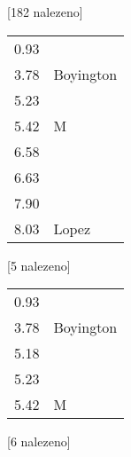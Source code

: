 \begin{table}[H]
\begin{tt}

\horizlina

\noindent
\begin{minipage}[t]{.5\textwidth}\vspace{0pt}
 [182 nalezeno]\vspace{5pt}

\begin{tabulary}{1.1\textwidth}{LL}
0.93 &   \\
3.78 &  Boyington \\
5.23 &   \\
5.42 &  M  \\
6.58 &   \\
6.63 &   \\
7.90 &   \\
8.03 &   Lopez \\
\end{tabulary}
\end{minipage}
\begin{minipage}[t]{.5\textwidth}\vspace{0pt}
 [5 nalezeno]\vspace{5pt}

\begin{tabulary}{1.1\textwidth}{LL}
0.93 &   \\
3.78 &  Boyington \\
5.18 &   \\
5.23 &   \\
5.42 &  M  \\
\end{tabulary}
\end{minipage}

\horizlina

\noindent
\begin{minipage}[t]{.5\textwidth}\vspace{0pt}
 [6 nalezeno]\vspace{5pt}


\end{minipage}
\end{tt}
\end{table}
